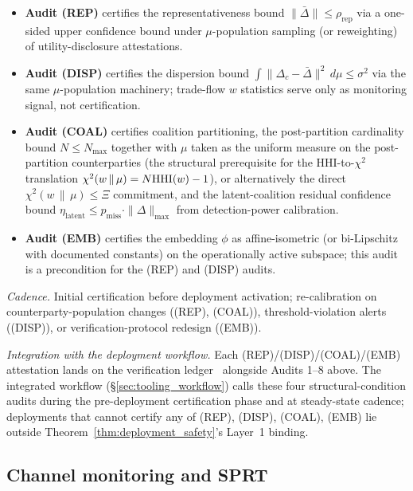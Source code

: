 \begin{itemize}
\item \textbf{Audit (REP)} certifies the representativeness
  bound $\|\bar\Delta\| \leq \rho_{\mathrm{rep}}$ via a
  one-sided upper confidence bound under $\mu$-population
  sampling (or reweighting) of utility-disclosure attestations.
\item \textbf{Audit (DISP)} certifies the dispersion bound
  $\int \|\Delta_c - \bar\Delta\|^2\, d\mu \leq \sigma^2$ via
  the same $\mu$-population machinery; trade-flow $w$ statistics
  serve only as monitoring signal, not certification.
\item \textbf{Audit (COAL)} certifies coalition partitioning,
  the post-partition cardinality bound $N \leq N_{\max}$ together
  with $\mu$ taken as the uniform measure on the post-partition
  counterparties (the structural prerequisite for the
  HHI-to-$\chi^2$ translation $\chi^2(w \,\|\, \mu) = N \mathrm{HHI}(w)
  - 1$), or alternatively the direct $\chi^2(w \,\|\, \mu) \leq
  \Xi$ commitment, and the latent-coalition residual confidence
  bound $\eta_{\mathrm{latent}} \leq p_{\mathrm{miss}} \cdot
  \|\Delta\|_{\max}$ from detection-power calibration.
\item \textbf{Audit (EMB)} certifies the embedding $\phi$ as
  affine-isometric (or bi-Lipschitz with documented constants)
  on the operationally active subspace; this audit is a
  precondition for the (REP) and (DISP) audits.
\end{itemize}

\emph{Cadence.} Initial certification before deployment
activation; re-calibration on counterparty-population changes
((REP), (COAL)), threshold-violation alerts ((DISP)), or
verification-protocol redesign ((EMB)).

\emph{Integration with the deployment workflow.} Each
(REP)/(DISP)/(COAL)/(EMB) attestation lands on the verification
ledger~\citep{lasser2026exo} alongside Audits 1--8 above. The
integrated workflow (\S\ref{sec:tooling_workflow}) calls these
four structural-condition audits during the pre-deployment
certification phase and at steady-state cadence; deployments
that cannot certify any of (REP), (DISP), (COAL), (EMB) lie
outside Theorem~\ref{thm:deployment_safety}'s Layer~1 binding.

\subsection{Channel monitoring and SPRT}
\label{sec:tooling_channels}

